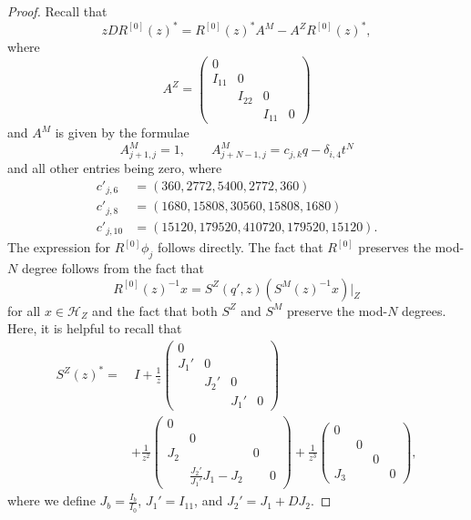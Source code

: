 \documentclass[10pt]{amsart}
\theoremstyle{definition}
\theoremstyle{remark}
\theoremstyle{plain}
\theoremstyle{definition}
\theoremstyle{remark}
\newcommand{\msc}[1]{\mathscr{#1}}
\newcommand{\1}{\mathbf{1}}
\newcommand{\2}{\mathbf{2}}
\newcommand{\3}{\mathbf{3}}
\numberwithin{equation}{section}
\begin{document}
\begin{proof}
    Recall that
    \[ zD R^{[0]}(z)^* = R^{[0]}(z)^* A^M - A^Z R^{[0]}(z)^*, \]
    where
    \[ A^Z = \begin{pmatrix}
        0 \\
        I_{11} & 0 \\
        & I_{22} & 0 \\
        & & I_{11} & 0
    \end{pmatrix}
    \]
    and $A^M$ is given by the formulae
    \[ A^M_{j+1,j} = 1, \qquad A^M_{j+N-1,j} = c_{j,k}q - \delta_{i,4}t^N \]
    and all other entries being zero, where
    \begin{align*}
        c'_{j,6} &= (360,2772,5400,2772,360) \\
        c'_{j,8} &= (1680,15808,30560,15808,1680) \\
        c'_{j,10} &= (15120,179520,410720,179520,15120). 
    \end{align*}
    The expression for $R^{[0]}\phi_j$ follows directly. The fact that $R^{[0]}$ preserves the mod-$N$ degree follows from the fact that
    \[ R^{[0]}(z)^{-1}x = S^Z(q',z) (S^M(z)^{-1}x)|_Z \]
    for all $x \in \msc{H}_Z$ and the fact that both $S^Z$ and $S^M$ preserve the mod-$N$ degrees. Here, it is helpful to recall that
    \begin{align*}
      S^{Z}(z)^* =&{}\ I + \frac{1}{z} \begin{pmatrix}
        0 \\
        J_1' & 0 \\
               & J_2' & 0 \\
               & & J_1' & 0
      \end{pmatrix} \\ &+ \frac{1}{z^2} \begin{pmatrix}
        0 \\
        & 0 \\
        J_2 & & 0 \\
          & \frac{J_2'}{J_1'}J_1 - J_2 & &  0
      \end{pmatrix} + \frac{1}{z^3} \begin{pmatrix}
        0 \\
        & 0 \\
        & & 0 \\
        J_3 & & & 0
      \end{pmatrix},
    \end{align*}
    where we define $J_b = \frac{I_b}{I_0}$, $J_1' = I_{11}$, and $J_2' = J_1 + D J_2$.
\end{proof}
\end{document}
